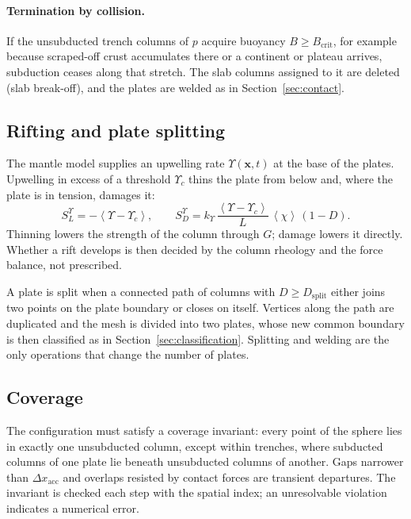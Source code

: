 \documentclass[11pt]{article}
\newcommand{\mac}[1]{\left\langle #1 \right\rangle}
\begin{document}
\paragraph{Termination by collision.}
If the unsubducted trench columns of $p$ acquire buoyancy
$B \ge B_{\mathrm{crit}}$, for example because scraped-off crust accumulates
there or a continent or plateau arrives, subduction ceases along that stretch.
The slab columns assigned to it are deleted (slab break-off), and the plates are
welded as in Section~\ref{sec:contact}.

\subsection{Rifting and plate splitting}
\label{sec:rifting}

The mantle model supplies an upwelling rate $\Upsilon(\mathbf{x},t)$ at the base
of the plates. Upwelling in excess of a threshold $\Upsilon_c$ thins the plate
from below and, where the plate is in tension, damages it:
\begin{equation}
  S_L^{\Upsilon} = -\mac{\Upsilon - \Upsilon_c},
  \qquad
  S_D^{\Upsilon} = k_{\Upsilon}\,\frac{\mac{\Upsilon-\Upsilon_c}}{L}\,\mac{\chi}\,(1-D).
\end{equation}
Thinning lowers the strength of the column through $G$; damage lowers it
directly. Whether a rift develops is then decided by the column rheology and the
force balance, not prescribed.

A plate is split when a connected path of columns with $D \ge D_{\mathrm{split}}$
either joins two points on the plate boundary or closes on itself. Vertices
along the path are duplicated and the mesh is divided into two plates, whose
new common boundary is then classified as in
Section~\ref{sec:classification}. Splitting and welding are the only operations
that change the number of plates.

\subsection{Coverage}

The configuration must satisfy a coverage invariant: every point of the sphere
lies in exactly one unsubducted column, except within trenches, where subducted
columns of one plate lie beneath unsubducted columns of another. Gaps narrower
than $\Delta x_{\mathrm{acc}}$ and overlaps resisted by contact forces are
transient departures. The invariant is checked each step with the spatial index;
an unresolvable violation indicates a numerical error.
\end{document}
